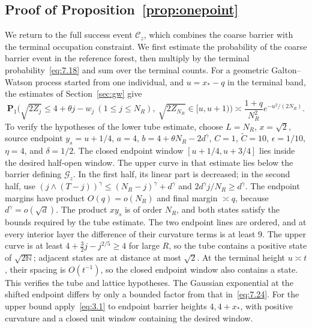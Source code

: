 \documentclass[11pt,letterpaper,reqno]{amsart}
\newif\ifrevmarks \revmarkstrue
\newcommand{\add}[1]{\ifrevmarks\textcolor{revorange}{#1}\else#1\fi}
\numberwithin{equation}{section}
\theoremstyle{remark}
\begin{document}
\subsection{Proof of Proposition~\ref{prop:onepoint}}\label{sec:coarseonepoint}\label{sec:firstmomentcompletion}
We return to the full success event $\mathcal C_z$, which combines the coarse barrier with the terminal occupation constraint. \add{We first estimate the probability of the coarse barrier event in the reference forest, then multiply by the terminal probability~\eqref{eq:7.18} and sum over the terminal counts.} For a geometric Galton--Watson process started from one individual, and $u=x_*-q$ in the terminal band, the estimates of Section~\ref{sec:gw} give
\begin{equation}\label{eq:7.24}
\mathbf P_1\bigl(\sqrt{2Z_j}\le4+\theta j-w_j\ (1\le j\le N_R),
\ \sqrt{2Z_{N_R}}\in[u,u+1)\bigr)
\asymp\frac{1+q}{N_R^2}e^{-u^2/(2N_R)}.
\end{equation}
To verify the hypotheses of the lower tube estimate, choose
$L=N_R$, $x=\sqrt2$, source endpoint $y_s=u+1/4$,
$a=4$, $b=4+\theta N_R-2d^\gamma$, $C=1$, $\widetilde C=10$,
$\epsilon=1/10$, $\eta=4$, and $\delta=1/2$.
The closed endpoint window $[u+1/4,u+3/4]$ lies inside the desired half-open window.
The upper curve in that estimate lies below the barrier defining $\mathcal G_z$. In the first half, its linear part is decreased; in the second half, use
$(j\wedge(T-j))^\gamma\le(N_R-j)^\gamma+d^\gamma$ and
$2d^\gamma j/N_R\ge d^\gamma$.
The endpoint margins have product $O(q)=o(N_R)$ and final margin $\asymp q$, because $d^\gamma=o(\sqrt d)$. The product $xy_s$ is of order $N_R$, and both states satisfy the bounds required by the tube estimate.
The two endpoint lines are ordered, and at every interior layer the difference of their curvature terms is at least $9$. The upper curve is at least $4+\tfrac32j-j^{2/5}\ge4$ for large $R$, so the tube contains a positive state of $\sqrt{2\mathbb N}$; adjacent states are at distance at most $\sqrt2$.
At the terminal height $u\asymp t$, their spacing is $O(t^{-1})$, so the closed endpoint window also contains a state. This verifies the tube and lattice hypotheses. The Gaussian exponential at the shifted endpoint differs by only a bounded factor from that in~\eqref{eq:7.24}.
For the upper bound apply~\eqref{eq:3.1} to endpoint barrier heights $4,4+x_*$, with positive curvature and a closed unit window containing the desired window.
\end{document}

